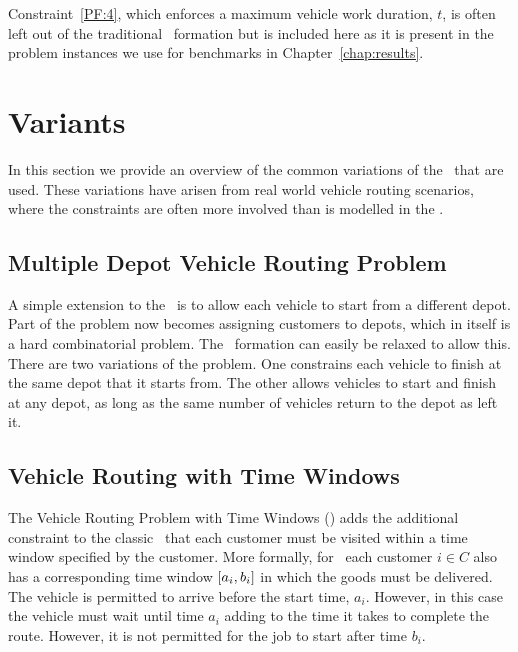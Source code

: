Constraint~\eqref{PF:4}, which enforces a maximum vehicle work duration, $t$, is often left out of the traditional \CVRP\ formation but is included here as it is present in the problem instances we use for benchmarks in Chapter~\ref{chap:results}.

\section{Variants}
\label{sec:variants}

In this section we provide an overview of the common variations of the \VRP\ that are used. These variations have arisen from real world vehicle routing scenarios, where the constraints are often more involved than is modelled in the \CVRP. 

\subsection{Multiple Depot Vehicle Routing Problem}

A simple extension to the \CVRP\ is to allow each vehicle to start from a different depot. Part of the problem now becomes assigning customers to depots, which in itself is a hard combinatorial problem. The \CVRP\ formation can easily be relaxed to allow this. There are two variations of the problem. One constrains each vehicle to finish at the same depot that it starts from. The other allows vehicles to start and finish at any depot, as long as the same number of vehicles return to the depot as left it.

\subsection{Vehicle Routing with Time Windows}

The Vehicle Routing Problem with Time Windows (\VRPTW) adds the additional constraint to the classic \VRP\ that each customer must be visited within a time window specified by the customer. More formally, for \VRPTW\ each customer $i \in C$ also has a corresponding time window $[a_i, b_i]$ in which the goods must be delivered. The vehicle is permitted to arrive before the start time, $a_i$. However, in this case the vehicle must wait until time $a_i$ adding to the time it takes to complete the route. However, it is not permitted for the job to start after time $b_i$.

